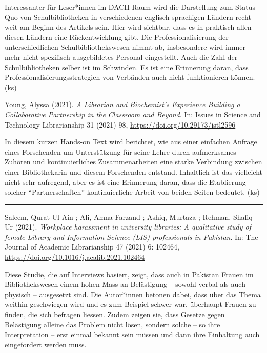 \documentclass[a4paper,
fontsize=11pt,
oneside,
numbers=noperiodatend,
parskip=half-,
bibliography=totoc,
final
]{scrartcl}
\begin{document}
Interessanter für Leser*innen im DACH-Raum wird die Darstellung zum
Status Quo von Schulbibliotheken in verschiedenen englisch-sprachigen
Ländern recht weit am Beginn des Artikels sein. Hier wird sichtbar, dass
es in praktisch allen diesen Ländern eine Rückentwicklung gibt. Die
Professionalisierung der unterschiedlichen Schulbibliothekswesen nimmt
ab, insbesondere wird immer mehr nicht spezifisch ausgebildetes Personal
eingestellt. Auch die Zahl der Schulbibliotheken selber ist im
Schwinden. Es ist eine Erinnerung daran, dass
Professionalisierungsstrategien von Verbänden auch nicht funktionieren
können. (ks)

Young, Alyssa (2021). \emph{A Librarian and Biochemist's Experience
Building a Collaborative Partnership in the Classroom and Beyond}. In:
Issues in Science and Technology Librarianship 31 (2021) 98,
\url{https://doi.org/10.29173/istl2596}

In diesem kurzen Hands-on Text wird berichtet, wie aus einer einfachen
Anfrage eines Forschenden um Unterstützung für seine Lehre durch
aufmerksames Zuhören und kontinuierliches Zusammenarbeiten eine starke
Verbindung zwischen einer Bibliothekarin und diesem Forschenden
entstand. Inhaltlich ist das vielleicht nicht sehr aufregend, aber es
ist eine Erinnerung daran, dass die Etablierung solcher
\enquote{Partnerschaften} kontinuierliche Arbeit von beiden Seiten
bedeutet. (ks)

\begin{center}\rule{0.5\linewidth}{0.5pt}\end{center}

Saleem, Qurat Ul Ain ; Ali, Amna Farzand ; Ashiq, Murtaza ; Rehman,
Shafiq Ur (2021). \emph{Workplace harassment in university libraries: A
qualitative study of female Library and Information Science (LIS)
professionals in Pakistan}. In: The Journal of Academic Librarianship 47
(2021) 6: 102464, \url{https://doi.org/10.1016/j.acalib.2021.102464}

Diese Studie, die auf Interviews basiert, zeigt, dass auch in Pakistan
Frauen im Bibliothekswesen einem hohen Mass an Belästigung -- sowohl
verbal als auch physisch -- ausgesetzt sind. Die Autor*innen betonen
dabei, dass über das Thema weithin geschwiegen wird und es zum Beispiel
schwer war, überhaupt Frauen zu finden, die sich befragen liessen. Zudem
zeigen sie, dass Gesetze gegen Belästigung alleine das Problem nicht
lösen, sondern solche -- so ihre Interpretation -- erst einmal bekannt
sein müssen und dann ihre Einhaltung auch eingefordert werden muss.
\end{document}
